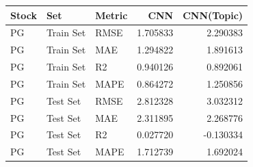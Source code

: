 \begin{tabular}{lllrr}
\toprule
Stock & Set & Metric & CNN & CNN(Topic) \\
\midrule
PG & Train Set & RMSE & 1.705833 & 2.290383 \\
PG & Train Set & MAE & 1.294822 & 1.891613 \\
PG & Train Set & R2 & 0.940126 & 0.892061 \\
PG & Train Set & MAPE & 0.864272 & 1.250856 \\
PG & Test Set & RMSE & 2.812328 & 3.032312 \\
PG & Test Set & MAE & 2.311895 & 2.268776 \\
PG & Test Set & R2 & 0.027720 & -0.130334 \\
PG & Test Set & MAPE & 1.712739 & 1.692024 \\
\bottomrule
\end{tabular}
